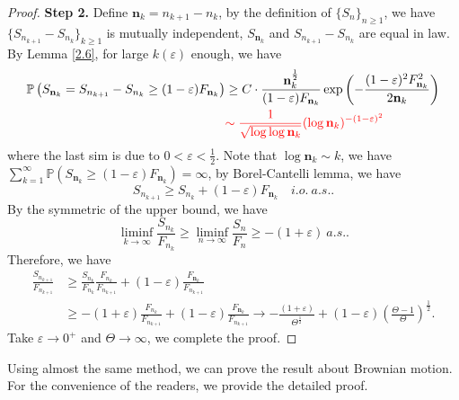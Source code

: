 \documentclass[11pt]{article}
\theoremstyle{definition}
\begin{document}
\begin{proof}
{\bf Step 2.} Define $\mathbf{n}_k=n_{k+1}-n_k$, by the definition of $\{S_n\}_{n\ge 1}$, we have $\{S_{n_{k+1}}-S_{n_k}\}_{k\ge 1}$ is mutually independent, $S_{\mathbf{n}_k}$ and $S_{n_{k+1}}-S_{n_k}$ are equal in law. By Lemma \ref{2.6}, for large $k(\varepsilon)$ enough, we have
\begin{equation*}
  \begin{aligned}
      \mathbb{P}\left(S_{\mathbf{n}_k}=S_{n_{k+1}}- S_{n_{k}}\ge (1-\varepsilon)F_{\mathbf{n}_k}\right)&\ge C\cdot \frac{\mathbf{n}_k^\frac{1}{2}}{(1-\varepsilon)F_{\mathbf{n}_k}}\exp\left( -\frac{(1-\varepsilon)^2 F^2_{\mathbf{n}_k}}{2\mathbf{n}_k} \right)\\
&{\color{red}\sim \frac{1}{\sqrt{\log \log \mathbf{n}_k}}(\log \mathbf{n}_k)^{-(1-\varepsilon)^2}}
  \end{aligned}
\end{equation*}
where the last sim is due to $0<\varepsilon<\frac{1}{2}$.  Note that $\log \mathbf{n}_k\sim k$, we have $\sum^\infty_{k=1}\mathbb{P}(S_{\mathbf{n}_k}\ge(1-\varepsilon)F_{\mathbf{n}_k})=\infty$, by Borel-Cantelli lemma, we have 
\[
S_{n_{k+1}}\ge S_{n_k}+(1-\varepsilon) F_{\mathbf{n}_k} \quad i.o. \ a.s..
\]
By the symmetric of the upper bound, we have
\[
\liminf_{k\rightarrow \infty} \frac{S_{n_k}}{F_{n_k}}\ge \liminf_{n\rightarrow \infty} \frac{S_{n}}{F_{n}}\ge -(1+\varepsilon)\ a.s..
\]
Therefore, we have
\begin{equation*}
  \begin{aligned}
     \frac{S_{n_{k+1}}}{F_{n_{k+1}}} &\ge \frac{S_{n_k}}{F_{n_k}}\frac{F_{n_k}}{F_{n_{k+1}}}+(1-\varepsilon)\frac{F_{\mathbf{n}_k}}{F_{n_{k+1}}}\\ 
&\ge -(1+\varepsilon) \frac{F_{n_k}}{F_{n_{k+1}}}+(1-\varepsilon)\frac{F_{\mathbf{n}_k}}{F_{n_{k+1}}}\rightarrow -\frac{(1+\varepsilon)}{\Theta^\frac{1}{2}}+(1-\varepsilon)\left( \frac{\Theta-1}{\Theta} \right)^\frac{1}{2}.
  \end{aligned}
\end{equation*}
Take $\varepsilon \rightarrow 0^+$ and $\Theta \rightarrow \infty$, we complete the proof.
\end{proof}
Using almost the same method, we can prove the result about Brownian motion. For the convenience of the readers, we provide the detailed proof.
\end{document}
